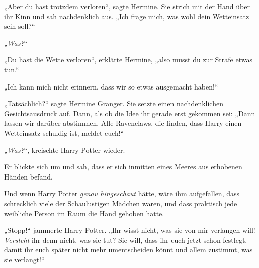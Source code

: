 „Aber du hast trotzdem verloren“, sagte Hermine. Sie strich mit der Hand über ihr Kinn und sah nachdenklich aus.
„Ich frage mich, was wohl dein Wetteinsatz sein soll?“

„\emph{Was?}“

„Du hast die Wette verloren“, erklärte Hermine, „also musst du zur Strafe etwas tun.“

„Ich kann mich nicht erinnern, dass wir so etwas ausgemacht haben!“

„Tatsächlich?“ sagte Hermine Granger. Sie setzte einen nachdenklichen Gesichtsausdruck auf. Dann, als ob die Idee ihr gerade erst gekommen sei:
„Dann lassen wir darüber abstimmen. Alle Ravenclaws, die finden, dass Harry einen Wetteinsatz schuldig ist, meldet euch!“

„\emph{Was?}“, kreischte Harry Potter wieder.

Er blickte sich um und sah, dass er sich inmitten eines Meeres aus erhobenen Händen befand.

Und wenn Harry Potter \emph{genau hingeschaut} hätte, wäre ihm aufgefallen, dass schrecklich viele der Schaulustigen Mädchen waren, und dass praktisch jede weibliche Person im Raum die Hand gehoben hatte.

„Stopp!“ jammerte Harry Potter.
„Ihr wisst nicht, was sie von mir verlangen will! \emph{Versteht} ihr denn nicht, was sie tut? Sie will, dass ihr euch jetzt schon festlegt, damit ihr euch später nicht mehr umentscheiden könnt und allem zustimmt, was sie verlangt!“

